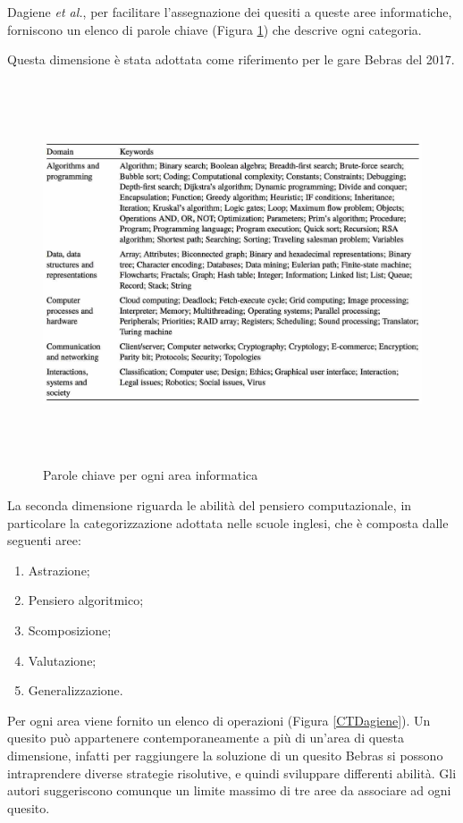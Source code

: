 \documentclass[12pt]{report}
\begin{document}
Dagiene \textit{et al.}, per facilitare l'assegnazione dei quesiti a queste aree informatiche, forniscono un elenco di parole chiave (Figura \ref{parole-chiave}) che descrive ogni categoria.
 
Questa dimensione è stata adottata come riferimento per le gare Bebras del 2017.

\begin{figure}[H]
	\centering
	\includegraphics[height=11.3cm]{./immagini/01_Cap1/informaticContentDagiene}
	\caption{Parole chiave per ogni area informatica \cite{DagieneINFORMATICA2017}}\label{parole-chiave}
\end{figure}

La seconda dimensione riguarda le abilità del pensiero computazionale, in particolare la categorizzazione adottata nelle scuole inglesi, che è composta dalle seguenti aree:
\begin{enumerate}
	\item Astrazione;
	\item Pensiero algoritmico;
	\item Scomposizione;
	\item Valutazione;
	\item Generalizzazione.
\end{enumerate}

Per ogni area viene fornito un elenco di operazioni (Figura \ref{CTDagiene}).
Un quesito può appartenere contemporaneamente a più di un'area di questa dimensione, infatti per raggiungere la soluzione di un quesito Bebras si possono intraprendere diverse strategie risolutive, e quindi sviluppare differenti abilità. 
Gli autori suggeriscono comunque un limite massimo di tre aree da associare ad ogni quesito.
\end{document}
